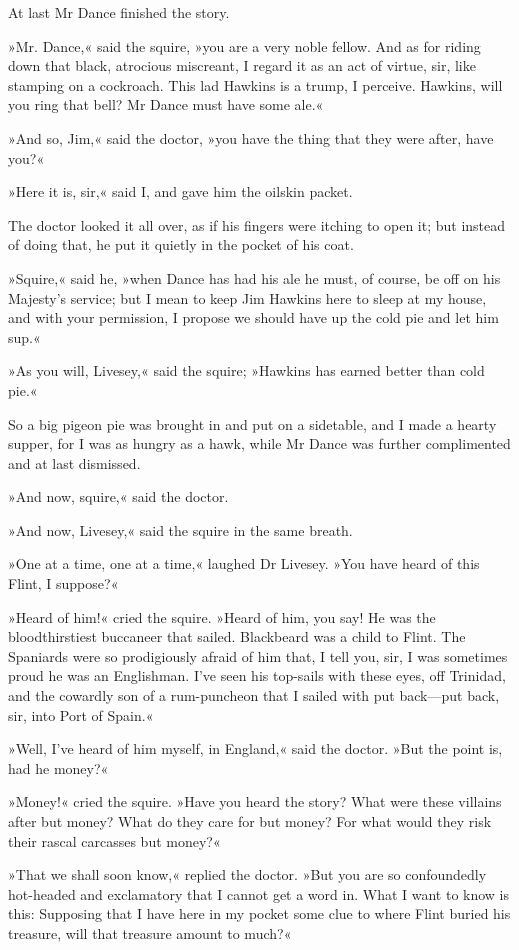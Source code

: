 At last Mr Dance finished the story.

»Mr. Dance,« said the squire, »you are a very noble fellow. And as for riding down that black, atrocious miscreant, I regard it as an act of virtue, sir, like stamping on a cockroach. This lad Hawkins is a trump, I perceive. Hawkins, will you ring that bell? Mr Dance must have some ale.«

»And so, Jim,« said the doctor, »you have the thing that they were after, have you?«

»Here it is, sir,« said I, and gave him the oilskin packet.

The doctor looked it all over, as if his fingers were itching to open it; but instead of doing that, he put it quietly in the pocket of his coat.

»Squire,« said he, »when Dance has had his ale he must, of course, be off on his Majesty's service; but I mean to keep Jim Hawkins here to sleep at my house, and with your permission, I propose we should have up the cold pie and let him sup.«

»As you will, Livesey,« said the squire; »Hawkins has earned better than cold pie.«

So a big pigeon pie was brought in and put on a sidetable, and I made a hearty supper, for I was as hungry as a hawk, while Mr Dance was further complimented and at last dismissed.

»And now, squire,« said the doctor.

»And now, Livesey,« said the squire in the same breath.

»One at a time, one at a time,« laughed Dr Livesey. »You have heard of this Flint, I suppose?«

»Heard of him!« cried the squire. »Heard of him, you say! He was the bloodthirstiest buccaneer that sailed. Blackbeard was a child to Flint. The Spaniards were so prodigiously afraid of him that, I tell you, sir, I was sometimes proud he was an Englishman. I've seen his top-sails with these eyes, off Trinidad, and the cowardly son of a rum-puncheon that I sailed with put back—put back, sir, into Port of Spain.«

»Well, I've heard of him myself, in England,« said the doctor. »But the point is, had he money?«

»Money!« cried the squire. »Have you heard the story? What were these villains after but money? What do they care for but money? For what would they risk their rascal carcasses but money?«

»That we shall soon know,« replied the doctor. »But you are so confoundedly hot-headed and exclamatory that I cannot get a word in. What I want to know is this: Supposing that I have here in my pocket some clue to where Flint buried his treasure, will that treasure amount to much?«

